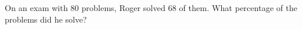 On an exam with $80$ problems, Roger solved $68$ of them. What percentage of the problems did he solve?
